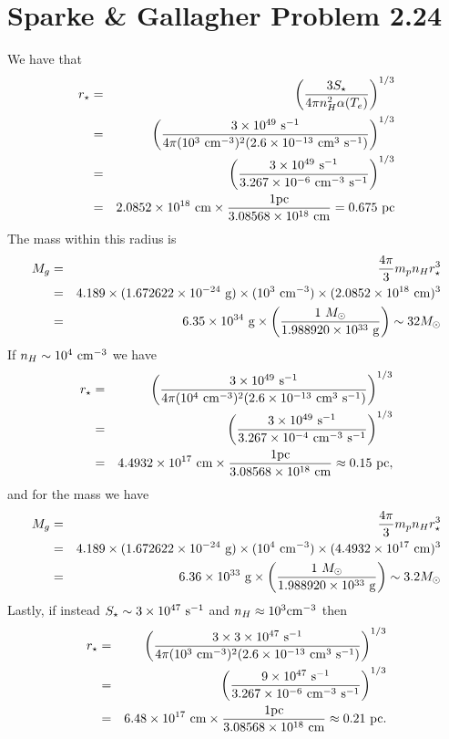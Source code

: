 \documentclass[]{article}
\begin{document}
\section{Sparke \& Gallagher Problem 2.24}
We have that
\begin{eqnarray}
r_{\star} &=& \left(\frac{3S_\star}{4\pi n_H^2 \alpha(T_e)}\right)^{1/3}\\
&=& \left(\frac{3\times 10^{49}~\mathrm{s}^{-1}}{4\pi (10^3~\mathrm{cm}^{-3})^2 (2.6\times10^{-13}~\mathrm{cm}^{3}~\mathrm{s}^{-1})}\right)^{1/3}\\
&=&\left(\frac{3\times10^{49}~\mathrm{s}^{-1}}{3.267\times10^{-6}~\mathrm{cm}^{-3}~\mathrm{s}^{-1}}\right)^{1/3}\\
&=& 2.0852\times10^{18}~\mathrm{cm} \times \frac{1\mathrm{pc}}{3.08568\times10^{18}~\mathrm{cm}} = 0.675~\mathrm{pc}
\end{eqnarray}
\noindent
The mass within this radius is
\begin{eqnarray}
M_g &=& \frac{4\pi}{3} m_p n_H r_{\star}^3\\
&=& 4.189 \times (1.672622\times10^{-24}~\mathrm{g}) \times(10^3~\mathrm{cm}^{-3})\times(2.0852\times10^{18}~\mathrm{cm})^3\\
&=&6.35\times10^{34}~\mathrm{g} \times \left(\frac{1~M_{\odot}}{1.988920\times10^{33}~\mathrm{g}}\right)\sim 32M_{\odot}
\end{eqnarray}
\noindent
If $n_H\sim10^4~\mathrm{cm}^{-3}$ we have
\begin{eqnarray}
r_{\star} 
&=& \left(\frac{3\times 10^{49}~\mathrm{s}^{-1}}{4\pi (10^4~\mathrm{cm}^{-3})^2 (2.6\times10^{-13}~\mathrm{cm}^{3}~\mathrm{s}^{-1})}\right)^{1/3}\\
&=&\left(\frac{3\times10^{49}~\mathrm{s}^{-1}}{3.267\times10^{-4}~\mathrm{cm}^{-3}~\mathrm{s}^{-1}}\right)^{1/3}\\
&=& 4.4932\times10^{17}~\mathrm{cm} \times \frac{1\mathrm{pc}}{3.08568\times10^{18}~\mathrm{cm}} \approx 0.15~\mathrm{pc},
\end{eqnarray}
\noindent
and for the mass we have
\begin{eqnarray}
M_g &=& \frac{4\pi}{3} m_p n_H r_{\star}^3\\
&=& 4.189 \times (1.672622\times10^{-24}~\mathrm{g}) \times(10^4~\mathrm{cm}^{-3})\times(4.4932\times10^{17}~\mathrm{cm})^3\\
&=&6.36\times10^{33}~\mathrm{g} \times \left(\frac{1~M_{\odot}}{1.988920\times10^{33}~\mathrm{g}}\right)\sim 3.2M_{\odot}
\end{eqnarray}
\noindent
Lastly, if instead $S_\star\sim3\times10^{47}~\mathrm{s}^{-1}$ and $n_H\approx10^3\mathrm{cm}^{-3}$ then
\begin{eqnarray}
r_{\star} 
&=& \left(\frac{3\times 3\times10^{47}~\mathrm{s}^{-1}}{4\pi (10^3~\mathrm{cm}^{-3})^2 (2.6\times10^{-13}~\mathrm{cm}^{3}~\mathrm{s}^{-1})}\right)^{1/3}\\
&=&\left(\frac{9\times10^{47}~\mathrm{s}^{-1}}{3.267\times10^{-6}~\mathrm{cm}^{-3}~\mathrm{s}^{-1}}\right)^{1/3}\\
&=& 6.48\times10^{17}~\mathrm{cm} \times \frac{1\mathrm{pc}}{3.08568\times10^{18}~\mathrm{cm}} \approx 0.21~\mathrm{pc}.
\end{eqnarray}
\end{document}
